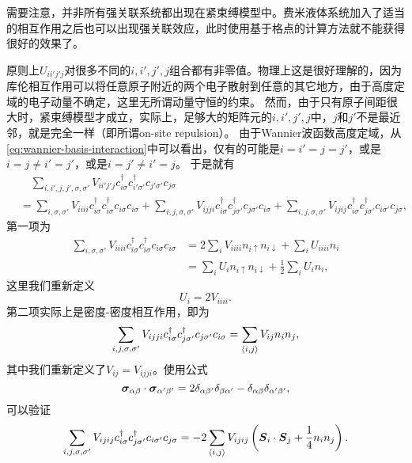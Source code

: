 需要注意，并非所有强关联系统都出现在紧束缚模型中。费米液体系统加入了适当的相互作用之后也可以出现强关联效应，此时使用基于格点的计算方法就不能获得很好的效果了。

原则上$U_{i i' j' j}$对很多不同的$i, i', j', j$组合都有非零值。物理上这是很好理解的，因为库伦相互作用可以将任意原子附近的两个电子散射到任意的其它地方，由于高度定域的电子动量不确定，这里无所谓动量守恒的约束。
然而，由于只有原子间距很大时，紧束缚模型才成立，实际上，足够大的矩阵元的$i, i', j', j$中，$j$和$j'$不是最近邻，就是完全一样（即所谓on-site repulsion）。
由于Wannier波函数高度定域，从\eqref{eq:wannier-basis-interaction}中可以看出，仅有的可能是$i=i'=j=j'$，或是$i=j \neq i'=j'$，或是$i=j' \neq i' = j$。
于是就有
\[
    \begin{aligned}
        &\quad \sum_{i, i', j, j', \sigma, \sigma'} V_{i i' j' j} c^\dagger_{i \sigma} c^\dagger_{i' \sigma'} c_{j' \sigma'} c_{j \sigma} \\
        &= \sum_{i, \sigma, \sigma'} V_{iiii} c^\dagger_{i \sigma} c^\dagger_{i \sigma} c_{i \sigma} c_{i \sigma} 
        + \sum_{i, j, \sigma, \sigma'} V_{i j j i} c^\dagger_{i \sigma} c^\dagger_{j \sigma'} c_{j \sigma'} c_{i \sigma}
        + \sum_{i, j, \sigma, \sigma'} V_{i j i j} c^\dagger_{i \sigma} c^\dagger_{j \sigma'} c_{i \sigma'} c_{j \sigma},
    \end{aligned}
\]
第一项为
\[
    \begin{aligned}
        \sum_{i, \sigma, \sigma'} V_{iiii} c^\dagger_{i \sigma} c^\dagger_{i \sigma} c_{i \sigma} c_{i \sigma} &= 2 \sum_{i} V_{iiii} n_{i \uparrow} n_{i \downarrow} + \sum_{i} U_{iiii} n_i \\
        &= \sum_{i} U_i n_{i \uparrow} n_{i \downarrow} + \frac{1}{2} \sum_{i} U_{i} n_i,
    \end{aligned}
\]
这里我们重新定义
\begin{equation}
    U_i = 2 V_{iiii}.
\end{equation}
第二项实际上是密度-密度相互作用，即为
\[
    \sum_{i, j, \sigma, \sigma'} V_{i j j i} c^\dagger_{i \sigma} c^\dagger_{j \sigma'} c_{j \sigma'} c_{i \sigma} = \sum_{\langle i, j \rangle} V_{ij} n_i n_j,
\]
其中我们重新定义了$V_{ij} = V_{ijji}$。使用公式
\[
    \vb*{\sigma}_{\alpha \beta} \cdot \vb*{\sigma}_{\alpha' \beta'} = 2 \delta_{\alpha \beta'} \delta_{\beta \alpha'} - \delta_{\alpha \beta} \delta_{\alpha' \beta'},
\]
可以验证
\[
    \sum_{i, j, \sigma, \sigma'} V_{i j i j} c^\dagger_{i \sigma} c^\dagger_{j \sigma'} c_{i \sigma'} c_{j \sigma} = - 2 \sum_{\langle i, j \rangle} V_{i j i j} \left( \vb*{S}_{i} \cdot \vb*{S}_j + \frac{1}{4} n_i n_j \right).
\]
